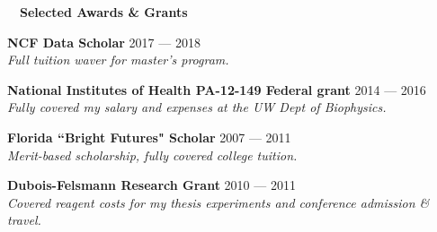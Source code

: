\documentclass[a4paper,12pt]{article}
\newcommand{\resheading}[1]{{\hspace{-9pt} \colorbox{mygrey}{\begin{minipage}{\textwidth}{\textmd{~~\large \textbf{#1} \vphantom{p\^{E}}}}\end{minipage}}\vspace{6pt}} }
\newcommand{\ressubheading}[4]{{\begin{minipage}{\textwidth}
        \textbf{#1} \hfill #2 \\
        \textit{#3} \hfill #4 \\
        \end{minipage}}}
\begin{document}
        
\resheading{Selected Awards \& Grants}
     \ressubheading{NCF Data Scholar}{2017 ---  2018}{Full tuition waver for master's program.}{}
         
    \ressubheading{National Institutes of Health PA-12-149 Federal grant}{2014 --- 2016}{Fully covered my salary and expenses at the UW Dept of Biophysics.}{}

   
    \ressubheading{Florida ``Bright Futures" Scholar}{2007 --- 2011}{Merit-based scholarship, fully covered college tuition.}{}

    \ressubheading{Dubois-Felsmann Research Grant}{2010 --- 2011}{Covered reagent costs for my thesis experiments and conference admission     \& travel.}{}
    
\end{document}
